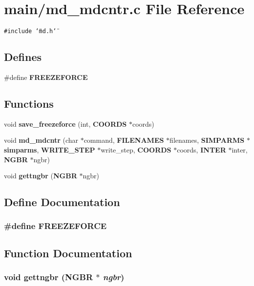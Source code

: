 \section{main/md\_\-mdcntr.c File Reference}
\label{md__mdcntr_8c}
{\tt \#include \char`\"{}md.h\char`\"{}}\par
\subsection*{Defines}
\begin{CompactItemize}
\item 
\#define {\bf FREEZEFORCE}
\end{CompactItemize}
\subsection*{Functions}
\begin{CompactItemize}
\item 
void {\bf save\_\-freezeforce} (int, {\bf COORDS} $\ast$coords)
\item 
void {\bf md\_\-mdcntr} (char $\ast$command, {\bf FILENAMES} $\ast$filenames, {\bf SIMPARMS} $\ast${\bf simparms}, {\bf WRITE\_\-STEP} $\ast$write\_\-step, {\bf COORDS} $\ast$coords, {\bf INTER} $\ast$inter, {\bf NGBR} $\ast$ngbr)
\item 
void {\bf gettngbr} ({\bf NGBR} $\ast$ngbr)
\end{CompactItemize}


\subsection{Define Documentation}
\subsubsection{\setlength{\rightskip}{0pt plus 5cm}\#define FREEZEFORCE}\label{md__mdcntr_8c_685787b51a85d4259f670367aad33bca}




\subsection{Function Documentation}
\subsubsection{\setlength{\rightskip}{0pt plus 5cm}void gettngbr ({\bf NGBR} $\ast$ {\em ngbr})}\label{md__mdcntr_8c_233f2c78de3bc9ce530da8786378d2de}


